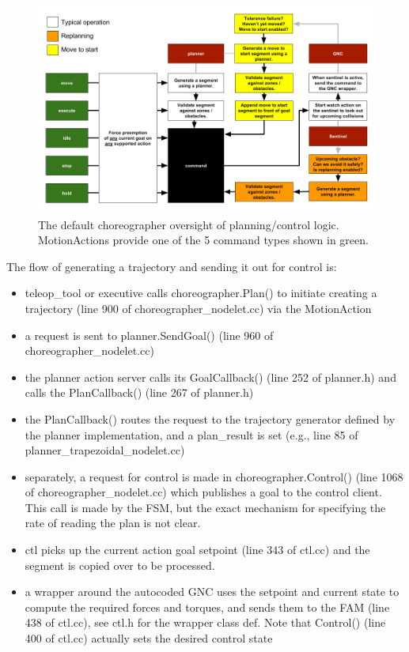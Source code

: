 \documentclass{article}
\begin{document}
\begin{figure}[h!]
	\centering
	\includegraphics[width=1.0\textwidth]{img/choreographer.png}
	\caption{The default choreographer oversight of planning/control logic. MotionActions provide one of the 5 command types shown in green.}
\end{figure}

The flow of generating a trajectory and sending it out for control is:
\begin{itemize}
	\item teleop\_tool or executive calls choreographer.Plan() to initiate creating a trajectory (line 900 of choreographer\_nodelet.cc) via the MotionAction
	\item a request is sent to planner.SendGoal() (line 960 of choreographer\_nodelet.cc)
	\item the planner action server calls its GoalCallback() (line 252 of planner.h) and calls the PlanCallback() (line 267 of planner.h)
	\item the PlanCallback() routes the request to the trajectory generator defined by the planner implementation, and a plan\_result is set (e.g., line 85 of planner\_trapezoidal\_nodelet.cc)
	\item separately, a request for control is made in choreographer.Control() (line 1068 of choreographer\_nodelet.cc) which publishes a goal to the control client. This call is made by the FSM, but the exact mechanism for specifying the rate of reading the plan is not clear.
	\item ctl picks up the current action goal setpoint (line 343 of ctl.cc) and the segment is copied over to be processed.
	\item a wrapper around the autocoded GNC uses the setpoint and current state to compute the required forces and torques, and sends them to the FAM (line 438 of ctl.cc), see ctl.h for the wrapper class def. Note that Control() (line 400 of ctl.cc) actually sets the desired control state
\end{itemize}
\end{document}
